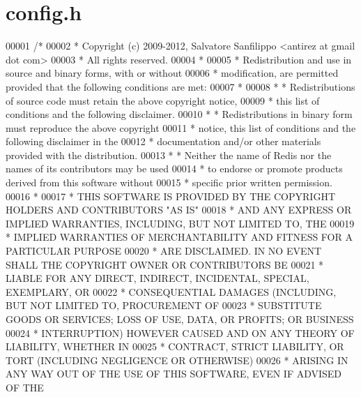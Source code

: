 \hypertarget{config_8h_source}{}\section{config.\+h}
\label{config_8h_source}

\begin{DoxyCode}
00001 \textcolor{comment}{/*}
00002 \textcolor{comment}{ * Copyright (c) 2009-2012, Salvatore Sanfilippo <antirez at gmail dot com>}
00003 \textcolor{comment}{ * All rights reserved.}
00004 \textcolor{comment}{ *}
00005 \textcolor{comment}{ * Redistribution and use in source and binary forms, with or without}
00006 \textcolor{comment}{ * modification, are permitted provided that the following conditions are met:}
00007 \textcolor{comment}{ *}
00008 \textcolor{comment}{ *   * Redistributions of source code must retain the above copyright notice,}
00009 \textcolor{comment}{ *     this list of conditions and the following disclaimer.}
00010 \textcolor{comment}{ *   * Redistributions in binary form must reproduce the above copyright}
00011 \textcolor{comment}{ *     notice, this list of conditions and the following disclaimer in the}
00012 \textcolor{comment}{ *     documentation and/or other materials provided with the distribution.}
00013 \textcolor{comment}{ *   * Neither the name of Redis nor the names of its contributors may be used}
00014 \textcolor{comment}{ *     to endorse or promote products derived from this software without}
00015 \textcolor{comment}{ *     specific prior written permission.}
00016 \textcolor{comment}{ *}
00017 \textcolor{comment}{ * THIS SOFTWARE IS PROVIDED BY THE COPYRIGHT HOLDERS AND CONTRIBUTORS "AS IS"}
00018 \textcolor{comment}{ * AND ANY EXPRESS OR IMPLIED WARRANTIES, INCLUDING, BUT NOT LIMITED TO, THE}
00019 \textcolor{comment}{ * IMPLIED WARRANTIES OF MERCHANTABILITY AND FITNESS FOR A PARTICULAR PURPOSE}
00020 \textcolor{comment}{ * ARE DISCLAIMED. IN NO EVENT SHALL THE COPYRIGHT OWNER OR CONTRIBUTORS BE}
00021 \textcolor{comment}{ * LIABLE FOR ANY DIRECT, INDIRECT, INCIDENTAL, SPECIAL, EXEMPLARY, OR}
00022 \textcolor{comment}{ * CONSEQUENTIAL DAMAGES (INCLUDING, BUT NOT LIMITED TO, PROCUREMENT OF}
00023 \textcolor{comment}{ * SUBSTITUTE GOODS OR SERVICES; LOSS OF USE, DATA, OR PROFITS; OR BUSINESS}
00024 \textcolor{comment}{ * INTERRUPTION) HOWEVER CAUSED AND ON ANY THEORY OF LIABILITY, WHETHER IN}
00025 \textcolor{comment}{ * CONTRACT, STRICT LIABILITY, OR TORT (INCLUDING NEGLIGENCE OR OTHERWISE)}
00026 \textcolor{comment}{ * ARISING IN ANY WAY OUT OF THE USE OF THIS SOFTWARE, EVEN IF ADVISED OF THE}

\end{DoxyCode}
